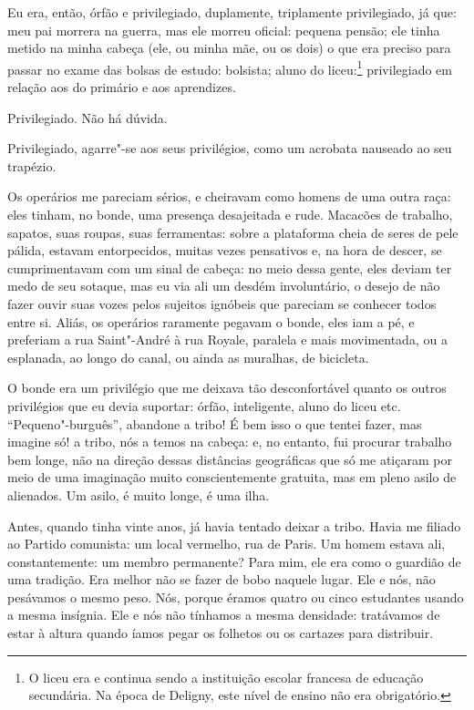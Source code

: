 Eu era, então, órfão e privilegiado, duplamente, triplamente
privilegiado, já que: meu pai morrera na guerra, mas ele morreu oficial:
pequena pensão; ele tinha metido na minha cabeça (ele, ou minha mãe, ou
os dois) o que era preciso para passar no exame das bolsas de estudo:
bolsista; aluno do liceu:\footnote{O liceu era e continua sendo a
  instituição escolar francesa de educação secundária. Na época de
  Deligny, este nível de ensino não era obrigatório.} privilegiado em
relação aos do primário e aos aprendizes.

Privilegiado. Não há dúvida.

Privilegiado, agarre"-se aos seus privilégios, como um acrobata nauseado
ao seu trapézio.

Os operários me pareciam sérios, e cheiravam como homens de uma outra
raça: eles tinham, no bonde, uma presença desajeitada e rude. Macacões
de trabalho, sapatos, suas roupas, suas ferramentas: sobre a plataforma
cheia de seres de pele pálida, estavam entorpecidos, muitas vezes
pensativos e, na hora de descer, se cumprimentavam com um sinal de
cabeça: no meio dessa gente, eles deviam ter medo de seu sotaque, mas eu
via ali um desdém involuntário, o desejo de não fazer ouvir suas vozes
pelos sujeitos ignóbeis que pareciam se conhecer todos entre si. Aliás,
os operários raramente pegavam o bonde, eles iam a pé, e preferiam a rua
Saint"-André à rua Royale, paralela e mais movimentada, ou a esplanada,
ao longo do canal, ou ainda as muralhas, de bicicleta.

O bonde era um privilégio que me deixava tão desconfortável quanto os
outros privilégios que eu devia suportar: órfão, inteligente, aluno do
liceu etc. ``Pequeno"-burguês'', abandone a tribo! É bem isso o que
tentei fazer, mas imagine só! a tribo, nós a temos na cabeça: e, no
entanto, fui procurar trabalho bem longe, não na direção dessas
distâncias geográficas que só me atiçaram por meio de uma imaginação
muito conscientemente gratuita, mas em pleno asilo de alienados. Um
asilo, é muito longe, é uma ilha.

Antes, quando tinha vinte anos, já havia tentado deixar a tribo. Havia
me filiado ao Partido comunista: um local vermelho, rua de Paris. Um
homem estava ali, constantemente: um membro permanente? Para mim, ele
era como o guardião de uma tradição. Era melhor não se fazer de bobo
naquele lugar. Ele e nós, não pesávamos o mesmo peso. Nós, porque éramos
quatro ou cinco estudantes usando a mesma insígnia. Ele e nós não
tínhamos a mesma densidade: tratávamos de estar à altura quando íamos
pegar os folhetos ou os cartazes para distribuir.

